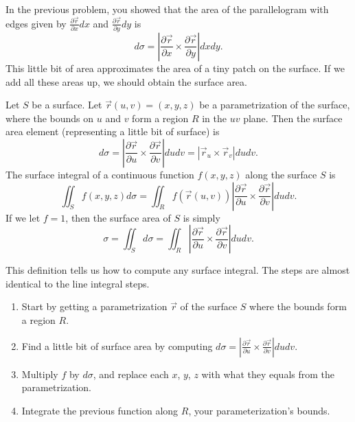 In the previous problem, you showed that the area of the parallelogram with edges given by $\frac{\partial \vec r}{\partial x}dx$ and $\frac{\partial \vec r}{\partial y}dy$ is $$d\sigma =\left |\frac{\partial \vec r}{\partial x} \times \frac{\partial \vec r}{\partial y}\right| dxdy.$$
This little bit of area approximates the area of a tiny patch on the surface.  If we add all these areas up, we should obtain the surface area.

\begin{definition}
 Let $S$ be a surface.  Let $\vec r(u,v)=(x,y,z)$ be a parametrization of the surface, where the bounds on $u$ and $v$ form a region $R$ in the $uv$ plane.  Then the surface area element (representing a little bit of surface) is 
$$d\sigma =\left |\frac{\partial \vec r}{\partial u} \times \frac{\partial \vec r}{\partial v}\right| dudv = \left|\vec r_u\times\vec r_v\right|dudv.$$
The surface integral of a continuous function $f(x,y,z)$ along the surface $S$ is 
$$\iint_S f(x,y,z) d\sigma = \iint_R f(\vec r(u,v)) \left |\frac{\partial \vec r}{\partial u} \times \frac{\partial \vec r}{\partial v}\right| dudv.$$
If we let $f=1$, then the surface area of $S$ is simply
$$\sigma = \iint_S d\sigma = \iint_R \left |\frac{\partial \vec r}{\partial u} \times \frac{\partial \vec r}{\partial v}\right| dudv.$$
\end{definition}

This definition tells us how to compute any surface integral. The steps are almost identical to the line integral steps.
\begin{enumerate}
 \item Start by getting a parametrization $\vec r$ of the surface $S$ where the bounds form a region $R$. 
 \item Find a little bit of surface area by computing $d\sigma =\left |\frac{\partial \vec r}{\partial u} \times \frac{\partial \vec r}{\partial v}\right| dudv.$
 \item Multiply $f$ by $d\sigma$, and replace each $x$, $y$, $z$ with what they equals from the parametrization.
 \item Integrate the previous function along $R$, your parameterization's bounds.
\end{enumerate}

